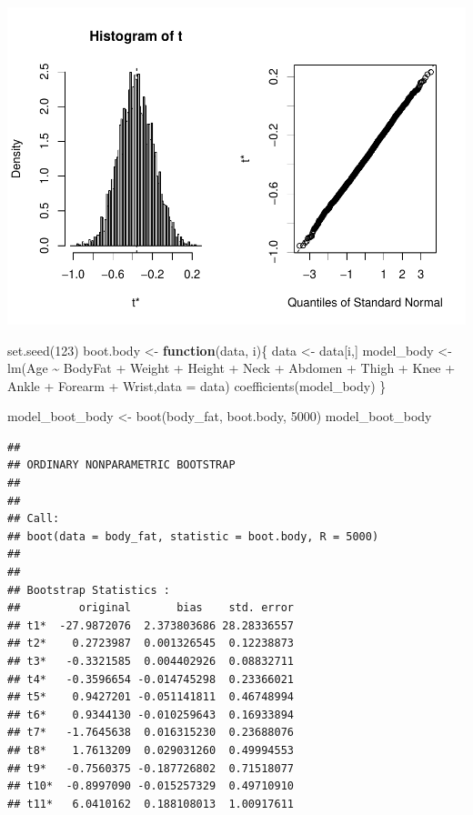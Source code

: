 \documentclass[
]{article}
\newenvironment{Shaded}{\begin{snugshade}}{\end{snugshade}}
\newcommand{\AttributeTok}[1]{\textcolor[rgb]{0.77,0.63,0.00}{#1}}
\newcommand{\ControlFlowTok}[1]{\textcolor[rgb]{0.13,0.29,0.53}{\textbf{#1}}}
\newcommand{\DecValTok}[1]{\textcolor[rgb]{0.00,0.00,0.81}{#1}}
\newcommand{\FunctionTok}[1]{\textcolor[rgb]{0.00,0.00,0.00}{#1}}
\newcommand{\NormalTok}[1]{#1}
\newcommand{\OtherTok}[1]{\textcolor[rgb]{0.56,0.35,0.01}{#1}}
\newcommand{\SpecialCharTok}[1]{\textcolor[rgb]{0.00,0.00,0.00}{#1}}
\begin{document}
\includegraphics{STAT641_Final_Report_files/figure-latex/unnamed-chunk-12-1.pdf}

\begin{Shaded}
\begin{Highlighting}[]
\FunctionTok{set.seed}\NormalTok{(}\DecValTok{123}\NormalTok{)}
\NormalTok{boot.body }\OtherTok{\textless{}{-}} \ControlFlowTok{function}\NormalTok{(data, i)\{}
\NormalTok{  data }\OtherTok{\textless{}{-}}\NormalTok{ data[i,]}
\NormalTok{  model\_body }\OtherTok{\textless{}{-}} \FunctionTok{lm}\NormalTok{(Age }\SpecialCharTok{\textasciitilde{}}\NormalTok{ BodyFat }\SpecialCharTok{+}\NormalTok{ Weight }\SpecialCharTok{+}\NormalTok{ Height }\SpecialCharTok{+}\NormalTok{ Neck }\SpecialCharTok{+}\NormalTok{ Abdomen }\SpecialCharTok{+}\NormalTok{ Thigh }\SpecialCharTok{+} 
\NormalTok{                     Knee }\SpecialCharTok{+}\NormalTok{ Ankle }\SpecialCharTok{+}\NormalTok{ Forearm }\SpecialCharTok{+}\NormalTok{ Wrist,}\AttributeTok{data =}\NormalTok{ data)}
  \FunctionTok{coefficients}\NormalTok{(model\_body)}
\NormalTok{\}}

\NormalTok{model\_boot\_body }\OtherTok{\textless{}{-}} \FunctionTok{boot}\NormalTok{(body\_fat, boot.body, }\DecValTok{5000}\NormalTok{)}
\NormalTok{model\_boot\_body}
\end{Highlighting}
\end{Shaded}

\begin{verbatim}
## 
## ORDINARY NONPARAMETRIC BOOTSTRAP
## 
## 
## Call:
## boot(data = body_fat, statistic = boot.body, R = 5000)
## 
## 
## Bootstrap Statistics :
##         original       bias    std. error
## t1*  -27.9872076  2.373803686 28.28336557
## t2*    0.2723987  0.001326545  0.12238873
## t3*   -0.3321585  0.004402926  0.08832711
## t4*   -0.3596654 -0.014745298  0.23366021
## t5*    0.9427201 -0.051141811  0.46748994
## t6*    0.9344130 -0.010259643  0.16933894
## t7*   -1.7645638  0.016315230  0.23688076
## t8*    1.7613209  0.029031260  0.49994553
## t9*   -0.7560375 -0.187726802  0.71518077
## t10*  -0.8997090 -0.015257329  0.49710910
## t11*   6.0410162  0.188108013  1.00917611
\end{verbatim}
\end{document}
